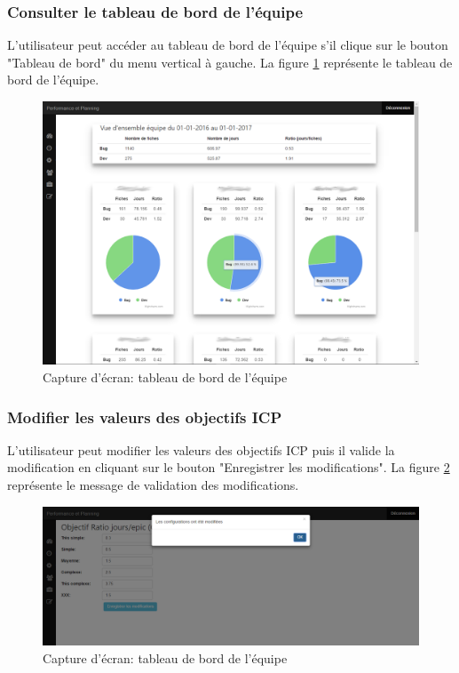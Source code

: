 \subsubsection{Consulter le tableau de bord de l'équipe}
L'utilisateur peut accéder au tableau de bord de l'équipe s'il clique sur le bouton "Tableau de bord" du menu vertical à gauche. La figure \ref{code91} représente le tableau de bord de l'équipe.
\begin{figure}[H]
  \centering
 \includegraphics[scale=0.37]{figures/printscreen_app/8_2.PNG}
 \caption{Capture d'écran: tableau de bord de l'équipe}
 \label{code91}
\end{figure}

\subsubsection{Modifier les valeurs des objectifs ICP}
L'utilisateur peut modifier les valeurs des objectifs ICP puis il valide la modification en cliquant sur le bouton "Enregistrer les modifications". La figure \ref{code92} représente le message de validation des modifications.
\begin{figure}[H]
  \centering
 \includegraphics[scale=0.37]{figures/printscreen_app/9_3.PNG}
 \caption{Capture d'écran: tableau de bord de l'équipe}
 \label{code92}
\end{figure}

